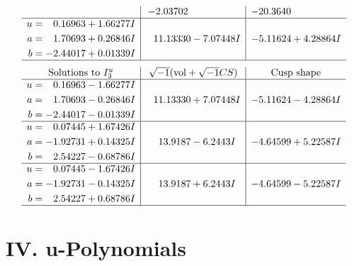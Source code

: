 \documentclass[1p]{elsarticle_modified}
\theoremstyle{definition}
\newcommand{\I}{\sqrt{-1}}
\begin{document}
$$\begin{array}{c|c|c}
 & -2.03702\phantom{ +0.000000I} & -20.3640\phantom{ +0.000000I} \\ \hline\begin{aligned}
u &= \phantom{-}0.16963 + 1.66277 I \\
a &= \phantom{-}1.70693 + 0.26846 I \\
b &= -2.44017 + 0.01339 I\end{aligned}
 & \phantom{-}11.13330 - 7.07448 I & -5.11624 + 4.28864 I\\
 \hline 
 \end{array}$$\newpage$$\begin{array}{c|c|c}  
\text{Solutions to }I^u_{3}& \I (\text{vol} + \sqrt{-1}CS) & \text{Cusp shape}\\
 \hline 
\begin{aligned}
u &= \phantom{-}0.16963 - 1.66277 I \\
a &= \phantom{-}1.70693 - 0.26846 I \\
b &= -2.44017 - 0.01339 I\end{aligned}
 & \phantom{-}11.13330 + 7.07448 I & -5.11624 - 4.28864 I \\ \hline\begin{aligned}
u &= \phantom{-}0.07445 + 1.67426 I \\
a &= -1.92731 + 0.14325 I \\
b &= \phantom{-}2.54227 - 0.68786 I\end{aligned}
 & \phantom{-}13.9187 - 6.2443 I & -4.64599 + 5.22587 I \\ \hline\begin{aligned}
u &= \phantom{-}0.07445 - 1.67426 I \\
a &= -1.92731 - 0.14325 I \\
b &= \phantom{-}2.54227 + 0.68786 I\end{aligned}
 & \phantom{-}13.9187 + 6.2443 I & -4.64599 - 5.22587 I\\
 \hline 
 \end{array}$$\newpage
\newpage\renewcommand{\arraystretch}{1}
\centering \section*{ IV. u-Polynomials}
\end{document}
